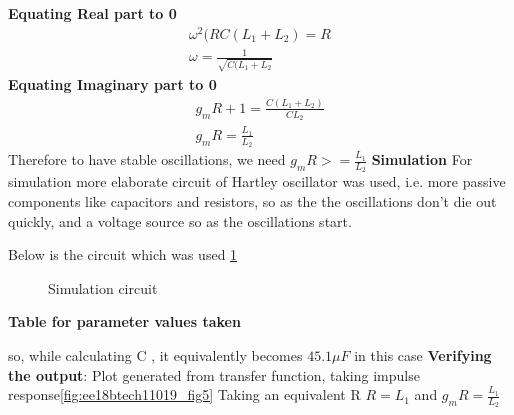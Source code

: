 \begin{enumerate}[label=\arabic*.,ref=\theenumi]
\textbf{Equating Real part to 0}\newline
\begin{align}
    \omega^2(RC(L_1 +L_2) = R\\
    \omega = \frac{1}{\sqrt{C(L_1 + L_2}}
\end{align}
\textbf{Equating Imaginary part to 0}\newline
\begin{align}
    g_mR + 1 = \frac{C(L_1 +L_2)}{CL_2}\\
    g_mR = \frac{L_1}{L_2}
\end{align}
Therefore to have stable oscillations, we need \newline
$g_mR >= \frac{L_1}{L_2}$\newline\newline
\textbf{Simulation}\newline
For simulation more elaborate circuit of Hartley oscillator was used, i.e. more passive components like capacitors and resistors, so as the the oscillations don't die out quickly, and a voltage source so as the oscillations start.\newline

Below is the circuit which was used \ref{fig:ee18btech11019_fig4}
\begin{figure}[!ht]
	\begin{center}
		\resizebox{\columnwidth}{!}{}
	\end{center}
\caption{Simulation circuit}
\label{fig:ee18btech11019_fig4}
\end{figure}


\textbf{Table for parameter values taken}
\begin{table}[!ht]
\centering

\caption{}
\label{table:ee18btech11019_1}
\end{table}
so, while calculating C , it equivalently becomes $45.1\mu F$ in this case\newline
\textbf{Verifying the output}:\newline
Plot generated from transfer function, taking impulse response\newline \ref{fig:ee18btech11019_fig5}
Taking an equivalent R  \newline
$R = L_1$ and $g_mR = \frac{L_1}{L_2}$\newline


\end{enumerate}
